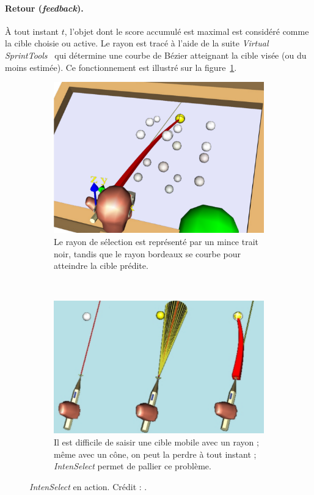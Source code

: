 	\paragraph{Retour (\emph{feedback}).}
	À tout instant $t$, l'objet dont le score accumulé est maximal est considéré comme la cible choisie ou active. Le rayon est tracé à l'aide de la suite \emph{Virtual SprintTools}~\cite{koutek2001spring} qui détermine une courbe de Bézier atteignant la cible visée (ou du moins estimée). Ce fonctionnement est illustré sur la figure~\ref{fig:intenSnap}.

	\begin{figure}[!htb]
		\begin{subfigure}[t]{0.46\textwidth}
			\centering
			\includegraphics[width=\textwidth]{figures/ch2/intenSnap}
			\caption{Le rayon de sélection est représenté par un mince trait noir, tandis que le rayon bordeaux se courbe pour atteindre la cible prédite.}
			\label{fig:intenSnap}
		\end{subfigure}
		~
		\begin{subfigure}[t]{0.52\textwidth}
			\centering
			\includegraphics[width=\textwidth]{figures/ch2/intenSnap2}
			\caption{Il est difficile de saisir une cible mobile avec un rayon ; même avec un cône, on peut la \og perdre \fg{} à tout instant ; \emph{IntenSelect} permet de pallier ce problème.}
			\label{fig:intenSnap2}
		\end{subfigure}
		\caption[\emph{IntenSelect}]{\emph{IntenSelect} en action. Crédit : \cite{de2005intenselect}.}
		\label{fig:intenSnap12}
	\end{figure}
	
